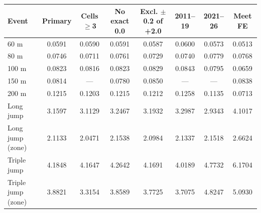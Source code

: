 \begin{tabular}{lccccccc}
\toprule
Event & Primary & Cells $\geq$3 & No exact 0.0 & Excl. $\pm$0.2 of +2.0 & 2011--19 & 2021--26 & Meet FE \\
\midrule
60 m & 0.0591 & 0.0590 & 0.0591 & 0.0587 & 0.0600 & 0.0573 & 0.0513 \\
80 m & 0.0746 & 0.0711 & 0.0761 & 0.0729 & 0.0740 & 0.0779 & 0.0768 \\
100 m & 0.0823 & 0.0816 & 0.0823 & 0.0829 & 0.0843 & 0.0795 & 0.0659 \\
150 m & 0.0814 & --- & 0.0780 & 0.0850 & --- & --- & 0.0838 \\
200 m & 0.1215 & 0.1203 & 0.1215 & 0.1212 & 0.1258 & 0.1135 & 0.0713 \\
Long jump & 3.1597 & 3.1129 & 3.2467 & 3.1932 & 3.2987 & 2.9343 & 4.1017 \\
Long jump (zone) & 2.1133 & 2.0471 & 2.1538 & 2.0984 & 2.1337 & 2.1518 & 2.6624 \\
Triple jump & 4.1848 & 4.1647 & 4.2642 & 4.1691 & 4.0189 & 4.7732 & 6.1704 \\
Triple jump (zone) & 3.8821 & 3.3154 & 3.8589 & 3.7725 & 3.7075 & 4.8247 & 5.0930 \\
\bottomrule
\end{tabular}
